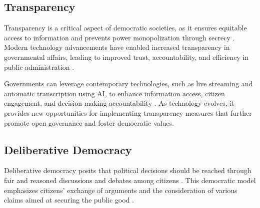 \documentclass{IEEEtran}
\begin{document}
\subsection{Transparency}

Transparency is a critical aspect of democratic societies, as it ensures equitable access to information and prevents power monopolization through secrecy \cite{florini2000democratizing}. Modern technology advancements have enabled increased transparency in governmental affairs, leading to improved trust, accountability, and efficiency in public administration \cite{grimmelikhuijsen2012transparency}.

Governments can leverage contemporary technologies, such as live streaming and automatic transcription using AI, to enhance information access, citizen engagement, and decision-making accountability \cite{meijer2009understanding}. As technology evolves, it provides new opportunities for implementing transparency measures that further promote open governance and foster democratic values.


\subsection{Deliberative Democracy}

Deliberative democracy posits that political decisions should be reached through fair and reasoned discussions and debates among citizens \cite{gutmann1996deliberative}. This democratic model emphasizes citizens' exchange of arguments and the consideration of various claims aimed at securing the public good \cite{elstub2010handbook}.
\end{document}
